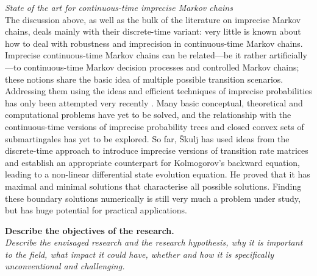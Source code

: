 \documentclass[11pt,dvipsnames,usenames,a4paper]{article}
\begin{document}
\emph{State of the art for continuous-time imprecise Markov chains}\\[5pt]
The discussion above, as well as the bulk of the literature on imprecise Markov chains, deals mainly with their discrete-time variant: very little is known about how to deal with robustness and imprecision in continuous-time Markov chains. 
Imprecise continuous-time Markov chains can be related---be it rather artificially---to continuous-time Markov decision processes and controlled Markov chains; these notions share the basic idea of multiple possible transition scenarios.
Addressing them using the ideas and efficient techniques of imprecise probabilities has only been attempted very recently \cite{skulj2015:continuous:bounds,Troffaes+GSB-ISIPTA15p,DeBock:2016:iCTMClimit}.
Many basic conceptual, theoretical and computational problems have yet to be solved, and the relationship with the continuous-time versions of imprecise probability trees and closed convex sets of submartingales has yet to be explored.
So far, Škulj \cite{skulj2015:continuous:bounds} has used ideas from the discrete-time approach to introduce imprecise versions of transition rate matrices and establish an appropriate counterpart for Kolmogorov's backward equation, leading to a non-linear differential state evolution equation. 
He proved that it has maximal and minimal solutions that characterise all possible solutions. Finding these boundary solutions numerically is still very much a problem under study, but has huge potential for practical applications.

\vspace{3mm}

\textbf{Describe the objectives of the research.}\\
\textit{Describe the envisaged research and the research hypothesis, why it is important to the field, what impact it could have, whether and how it is specifically unconventional and challenging.}
\end{document}
